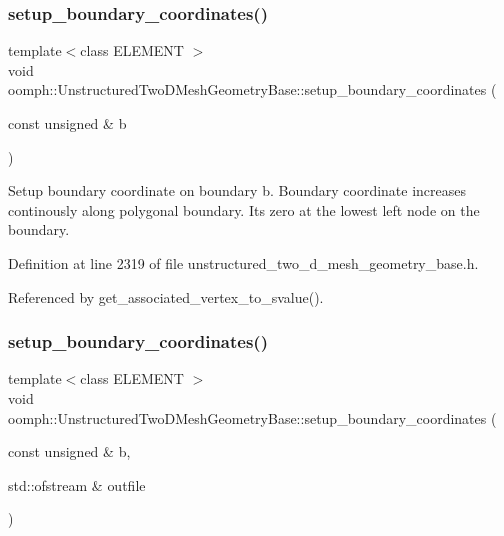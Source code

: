\subsubsection{\texorpdfstring{setup\+\_\+boundary\+\_\+coordinates()}{setup\_boundary\_coordinates()}\hspace{0.1cm}{\footnotesize\ttfamily [1/2]}}
{\footnotesize\ttfamily template$<$class E\+L\+E\+M\+E\+NT $>$ \\
void oomph\+::\+Unstructured\+Two\+D\+Mesh\+Geometry\+Base\+::setup\+\_\+boundary\+\_\+coordinates (\begin{DoxyParamCaption}\item[{const unsigned \&}]{b }\end{DoxyParamCaption})\hspace{0.3cm}{\ttfamily [inline]}}



Setup boundary coordinate on boundary b. Boundary coordinate increases continously along polygonal boundary. It\textquotesingle{}s zero at the lowest left node on the boundary. 



Definition at line 2319 of file unstructured\+\_\+two\+\_\+d\+\_\+mesh\+\_\+geometry\+\_\+base.\+h.



Referenced by get\+\_\+associated\+\_\+vertex\+\_\+to\+\_\+svalue().

\mbox{\label{classoomph_1_1UnstructuredTwoDMeshGeometryBase_a133876ad6f2c50ca0325b1f8f49fb42d}} 
\subsubsection{\texorpdfstring{setup\+\_\+boundary\+\_\+coordinates()}{setup\_boundary\_coordinates()}\hspace{0.1cm}{\footnotesize\ttfamily [2/2]}}
{\footnotesize\ttfamily template$<$class E\+L\+E\+M\+E\+NT $>$ \\
void oomph\+::\+Unstructured\+Two\+D\+Mesh\+Geometry\+Base\+::setup\+\_\+boundary\+\_\+coordinates (\begin{DoxyParamCaption}\item[{const unsigned \&}]{b,  }\item[{std\+::ofstream \&}]{outfile }\end{DoxyParamCaption})}



